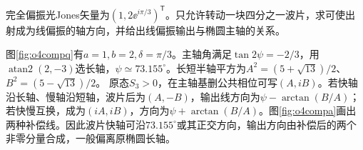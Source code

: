\begin{exercise}\label{ex:o4compensator}
完全偏振光Jones矢量为$(1,2\ee^{i\pi/3})^{\mathsf T}$。只允许转动一块四分之一波片，求可使出射成为线偏振的轴方向，并给出线偏振输出与椭圆主轴的关系。
\end{exercise}
\begin{solution}
图\ref{fig:o4compq}有$a=1,b=2,\delta=\pi/3$。主轴角满足$\tan2\psi=-2/3$，用$\operatorname{atan2}(2,-3)$选长轴，$\psi\simeq73.155^\circ$。长短半轴平方为$A^2=(5+\sqrt{13})/2$、$B^2=(5-\sqrt{13})/2$。
原态$S_3>0$，在主轴基删公共相位可写$(A,iB)$。若快轴沿长轴、慢轴沿短轴，波片后为$(A,-B)$，输出线方向为$\psi-\arctan(B/A)$；若快慢互换，成为$(iA,iB)$，方向为$\psi+\arctan(B/A)$。图\ref{fig:o4compa}画出两种补偿线。因此波片快轴可沿$73.155^\circ$或其正交方向，输出方向由补偿后的两个非零分量合成，一般偏离原椭圆长轴。
\end{solution}
